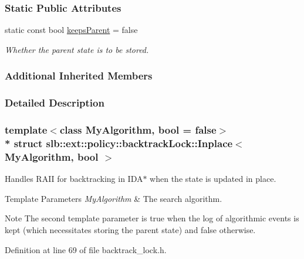 \subsubsection*{Static Public Attributes}
\begin{DoxyCompactItemize}
\item 
static const bool \hyperlink{structslb_1_1ext_1_1policy_1_1backtrackLock_1_1Inplace_a5a7d3dfd27dbf3fecd5133837f2b63e3}{keeps\+Parent} = false\hypertarget{structslb_1_1ext_1_1policy_1_1backtrackLock_1_1Inplace_a5a7d3dfd27dbf3fecd5133837f2b63e3}{}\label{structslb_1_1ext_1_1policy_1_1backtrackLock_1_1Inplace_a5a7d3dfd27dbf3fecd5133837f2b63e3}

\begin{DoxyCompactList}\small\item\em Whether the parent state is to be stored. \end{DoxyCompactList}\end{DoxyCompactItemize}
\subsubsection*{Additional Inherited Members}


\subsubsection{Detailed Description}
\subsubsection*{template$<$class My\+Algorithm, bool = false$>$\\*
struct slb\+::ext\+::policy\+::backtrack\+Lock\+::\+Inplace$<$ My\+Algorithm, bool $>$}

Handles R\+A\+II for backtracking in I\+D\+A$\ast$ when the state is updated in place. 


\begin{DoxyTemplParams}{Template Parameters}
{\em My\+Algorithm} & The search algorithm. \\
\hline
\end{DoxyTemplParams}
\begin{DoxyNote}{Note}
The second template parameter is {\ttfamily true} when the log of algorithmic events is kept (which necessitates storing the parent state) and {\ttfamily false} otherwise. 
\end{DoxyNote}


Definition at line 69 of file backtrack\+\_\+lock.\+h.




